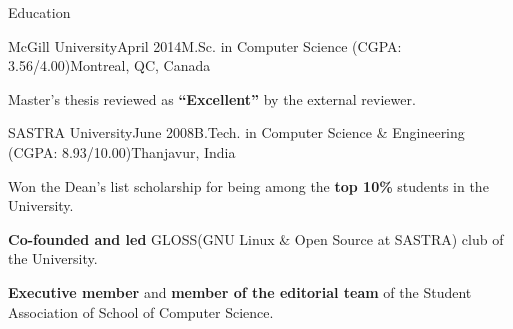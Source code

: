 \documentclass{resume} %
\begin{document}
\begin{rSection}{Education}

\begin{rSubsection}{McGill University}{April 2014}{M.Sc. in
Computer Science (CGPA: 3.56/4.00)}{Montreal, QC, Canada} 
\item Master's thesis reviewed as \textbf{``Excellent''} by the external
reviewer.
\end{rSubsection}

\begin{rSubsection}{SASTRA University}{June 2008}{B.Tech. in Computer Science
\& Engineering (CGPA: 8.93/10.00)}{Thanjavur, India} 
\item Won the {Dean's list scholarship} for being among the \textbf{top
10\%} students in the University. 
\item \textbf{Co-founded and led} GLOSS(GNU Linux \& Open Source at SASTRA)
club of the University.  
\item \textbf{Executive member} and \textbf{member of the editorial team} of
the Student Association of School of Computer Science. 
\end{rSubsection}

\end{rSection}
\end{document}
